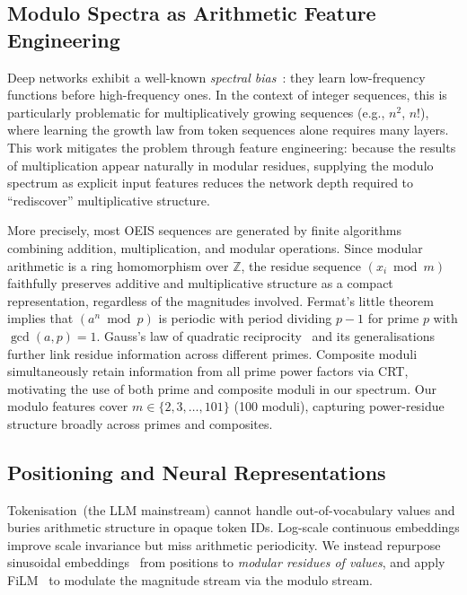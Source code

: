 \subsection{Modulo Spectra as Arithmetic Feature Engineering}
\label{sec:background:modulo-engineering}

Deep networks exhibit a well-known \emph{spectral bias}~\cite{rahaman2019spectral}:
they learn low-frequency functions before high-frequency ones. In the context of integer
sequences, this is particularly problematic for multiplicatively growing sequences
(e.g., $n^2$, $n!$), where learning the growth law from token sequences alone requires
many layers.
This work mitigates the problem through feature engineering: because the results of
multiplication appear naturally in modular residues, supplying the modulo spectrum as explicit
input features reduces the network depth required to ``rediscover'' multiplicative structure.

More precisely, most OEIS sequences are generated by finite algorithms combining addition,
multiplication, and modular operations. Since modular arithmetic is a ring homomorphism over
$\mathbb{Z}$, the residue sequence $(x_i \bmod m)$ faithfully preserves additive and
multiplicative structure as a compact representation, regardless of the magnitudes involved.
Fermat's little theorem implies that $(a^n \bmod p)$ is periodic with period dividing $p-1$
for prime $p$ with $\gcd(a,p)=1$. Gauss's law of quadratic
reciprocity~\cite{gauss-reciprocity} and its generalisations further link residue information
across different primes.
Composite moduli simultaneously retain information from all prime power factors via CRT,
motivating the use of both prime and composite moduli in our spectrum.
Our modulo features cover $m \in \{2, 3, \ldots, 101\}$ (100 moduli), capturing power-residue
structure broadly across primes and composites.

\subsection{Positioning and Neural Representations}
\label{sec:background:repr-position}

Tokenisation~(the LLM mainstream) cannot handle out-of-vocabulary values and buries
arithmetic structure in opaque token IDs. Log-scale continuous embeddings improve scale
invariance but miss arithmetic periodicity. We instead repurpose sinusoidal
embeddings~\cite{vaswani2017attention} from positions to \emph{modular residues of values},
and apply FiLM~\cite{perez2018film} to modulate the magnitude stream via the modulo stream.


